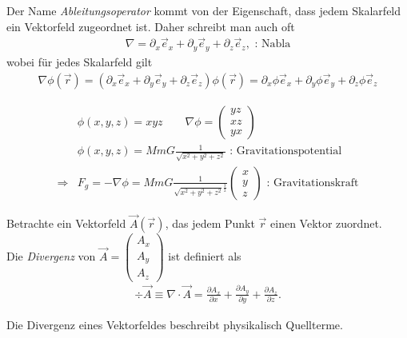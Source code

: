 \begin{Definition}[Ableitungsoperator]
Der Name {\em Ableitungsoperator} kommt von der Eigenschaft, dass jedem
Skalarfeld ein Vektorfeld zugeordnet ist. Daher schreibt man auch oft
\begin{align*}
\nabla = \partial_x \vec{e}_x + \partial_y \vec{e}_y + \partial_z \vec{e}_z, 
\text{ : Nabla}
\end{align*}
wobei für jedes Skalarfeld gilt
\begin{align*}
\nabla \phi(\vec{r}) = (\partial_x \vec{e}_x + \partial_y \vec{e}_y +
\partial_z \vec{e}_z)\phi(\vec{r}) = \partial_x \phi \vec{e}_x + \partial_y \phi
\vec{e}_y + \partial_z \phi \vec{e}_z
\end{align*}
\end{Definition}


\begin{Beispiel}
  \begin{align*}
  &\phi(x,y,z) = xyz\qquad \nabla\phi =
  \begin{pmatrix}yz\\xz\\yx\end{pmatrix}\\
   &\phi(x,y,z) = MmG \frac{1}{\sqrt{x^2+y^2+z^2}} \text{ :
 Gravitationspotential}\\
 \Rightarrow & F_g = -\nabla \phi = MmG
 \frac{1}{\sqrt{x^2+y^2+z^2}^{\frac{3}{2}}}\begin{pmatrix}x\\y\\z\end{pmatrix}
 \text{ : Gravitationskraft}
 \end{align*}

\end{Beispiel}

\begin{Definition}[Divergenz]
Betrachte ein Vektorfeld $\vec{A}(\vec{r})$, das jedem Punkt $\vec{r}$ einen
Vektor zuordnet.\\
Die {\em Divergenz} von $\vec{A} =
\begin{pmatrix}A_x\\A_y\\A_z\end{pmatrix}$ ist definiert als
\begin{align*}
\div \vec{A} \equiv \nabla \cdot \vec{A} = \frac{\partial A_x}{\partial x} +
\frac{\partial A_y}{\partial y} + \frac{\partial A_z}{\partial z}.
\end{align*}
\end{Definition}
Die Divergenz eines Vektorfeldes beschreibt physikalisch Quellterme.

